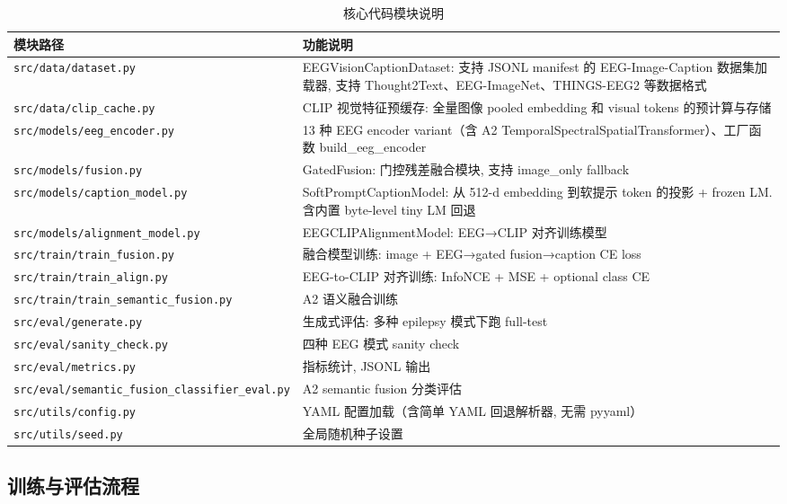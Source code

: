 \begin{table}[H]
  \centering
  \caption{核心代码模块说明}
  \label{tab:code-modules}
  \begin{tabularx}{\linewidth}{l X}
    \toprule
    模块路径 & 功能说明 \\
    \midrule
    \texttt{src/data/dataset.py} & EEGVisionCaptionDataset: 支持 JSONL manifest 的 EEG-Image-Caption 数据集加载器, 支持 Thought2Text、EEG-ImageNet、THINGS-EEG2 等数据格式 \\
    \texttt{src/data/clip\_cache.py} & CLIP 视觉特征预缓存: 全量图像 pooled embedding 和 visual tokens 的预计算与存储 \\
    \texttt{src/models/eeg\_encoder.py} & 13 种 EEG encoder variant（含 A2 TemporalSpectralSpatialTransformer）、工厂函数 build\_eeg\_encoder \\
    \texttt{src/models/fusion.py} & GatedFusion: 门控残差融合模块, 支持 image\_only fallback \\
    \texttt{src/models/caption\_model.py} & SoftPromptCaptionModel: 从 512-d embedding 到软提示 token 的投影 + frozen LM. 含内置 byte-level tiny LM 回退 \\
    \texttt{src/models/alignment\_model.py} & EEGCLIPAlignmentModel: EEG→CLIP 对齐训练模型 \\
    \texttt{src/train/train\_fusion.py} & 融合模型训练: image + EEG→gated fusion→caption CE loss \\
    \texttt{src/train/train\_align.py} & EEG-to-CLIP 对齐训练: InfoNCE + MSE + optional class CE \\
    \texttt{src/train/train\_semantic\_fusion.py} & A2 语义融合训练 \\
    \texttt{src/eval/generate.py} & 生成式评估: 多种 epilepsy 模式下跑 full-test \\
    \texttt{src/eval/sanity\_check.py} & 四种 EEG 模式 sanity check \\
    \texttt{src/eval/metrics.py} & 指标统计, JSONL 输出 \\
    \texttt{src/eval/semantic\_fusion\_classifier\_eval.py} & A2 semantic fusion 分类评估 \\
    \texttt{src/utils/config.py} & YAML 配置加载（含简单 YAML 回退解析器, 无需 pyyaml）\\
    \texttt{src/utils/seed.py} & 全局随机种子设置 \\
    \bottomrule
  \end{tabularx}
\end{table}

\subsection{训练与评估流程}


